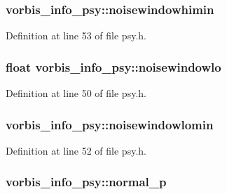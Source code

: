 \subsubsection[{\texorpdfstring{noisewindowhimin}{noisewindowhimin}}]{ vorbis\+\_\+info\+\_\+psy\+::noisewindowhimin}\hypertarget{structvorbis__info__psy_ae3d1c2bece355a1dc347ea0f04e51a38}{}\label{structvorbis__info__psy_ae3d1c2bece355a1dc347ea0f04e51a38}


Definition at line 53 of file psy.\+h.

\subsubsection[{\texorpdfstring{noisewindowlo}{noisewindowlo}}]{\setlength{\rightskip}{0pt plus 5cm}float vorbis\+\_\+info\+\_\+psy\+::noisewindowlo}\hypertarget{structvorbis__info__psy_a6cfe41252db68bd2f1bb408119673b3a}{}\label{structvorbis__info__psy_a6cfe41252db68bd2f1bb408119673b3a}


Definition at line 50 of file psy.\+h.

\subsubsection[{\texorpdfstring{noisewindowlomin}{noisewindowlomin}}]{ vorbis\+\_\+info\+\_\+psy\+::noisewindowlomin}\hypertarget{structvorbis__info__psy_a2db09fd0e801f1b6f2c99850391fd940}{}\label{structvorbis__info__psy_a2db09fd0e801f1b6f2c99850391fd940}


Definition at line 52 of file psy.\+h.

\subsubsection[{\texorpdfstring{normal\+\_\+p}{normal_p}}]{ vorbis\+\_\+info\+\_\+psy\+::normal\+\_\+p}\hypertarget{structvorbis__info__psy_ae6765718469a8efa31817f451996951f}{}\label{structvorbis__info__psy_ae6765718469a8efa31817f451996951f}


